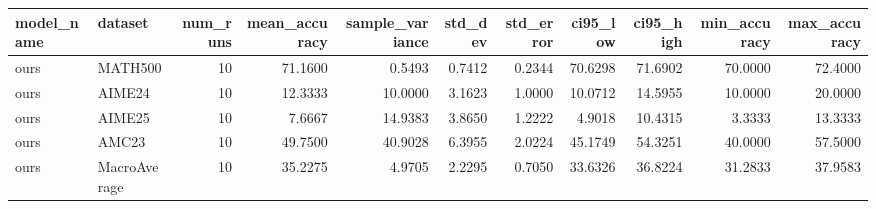 \begin{tabular}{llrrrrrrrrr}
\toprule
model_name & dataset & num_runs & mean_accuracy & sample_variance & std_dev & std_error & ci95_low & ci95_high & min_accuracy & max_accuracy \\
\midrule
ours & MATH500 & 10 & 71.1600 & 0.5493 & 0.7412 & 0.2344 & 70.6298 & 71.6902 & 70.0000 & 72.4000 \\
ours & AIME24 & 10 & 12.3333 & 10.0000 & 3.1623 & 1.0000 & 10.0712 & 14.5955 & 10.0000 & 20.0000 \\
ours & AIME25 & 10 & 7.6667 & 14.9383 & 3.8650 & 1.2222 & 4.9018 & 10.4315 & 3.3333 & 13.3333 \\
ours & AMC23 & 10 & 49.7500 & 40.9028 & 6.3955 & 2.0224 & 45.1749 & 54.3251 & 40.0000 & 57.5000 \\
ours & MacroAverage & 10 & 35.2275 & 4.9705 & 2.2295 & 0.7050 & 33.6326 & 36.8224 & 31.2833 & 37.9583 \\
\bottomrule
\end{tabular}
